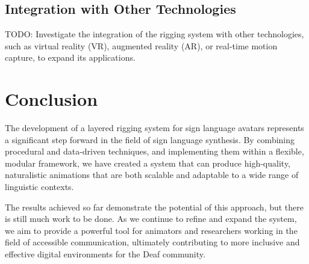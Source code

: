 \documentclass[../../main.tex]{subfiles}
\begin{document}
\subsection{Integration with Other Technologies}
TODO: Investigate the integration of the rigging system with other technologies, such as virtual reality (VR), augmented reality (AR), or real-time motion capture, to expand its applications.

\section{Conclusion}
The development of a layered rigging system for sign language avatars represents a significant step forward in the field of sign language synthesis. By combining procedural and data-driven techniques, and implementing them within a flexible, modular framework, we have created a system that can produce high-quality, naturalistic animations that are both scalable and adaptable to a wide range of linguistic contexts.

The results achieved so far demonstrate the potential of this approach, but there is still much work to be done. As we continue to refine and expand the system, we aim to provide a powerful tool for animators and researchers working in the field of accessible communication, ultimately contributing to more inclusive and effective digital environments for the Deaf community.
\end{document}

